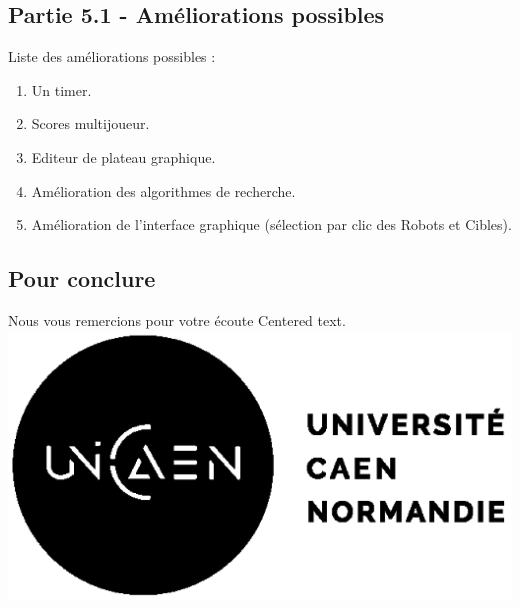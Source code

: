 \documentclass{beamer} %
\begin{document}
	\subsection{Partie 5.1 - Améliorations possibles}
\begin{frame}[plain]
Liste des améliorations possibles :
\begin{enumerate}
	\item Un timer.
	\item Scores multijoueur.
	\item Editeur de plateau graphique.
	\item Amélioration des algorithmes de recherche.
	\item Amélioration de l'interface graphique (sélection par clic des Robots et Cibles).
\end{enumerate}

\end{frame}

	\subsection{Pour conclure}\vspace*{\fill}
\centering Nous vous remercions pour votre écoute
\vspace*{\fill}
\hspace{0pt}
\vfill
Centered text.
\vfill
\hspace{0pt}
\includegraphics[scale=0.4]{images/unicaen.png}
\end{document}
